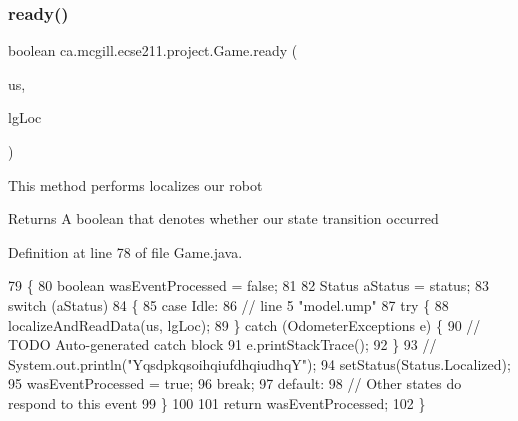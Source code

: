 \subsubsection{\texorpdfstring{ready()}{ready()}}
{\footnotesize\ttfamily boolean ca.\+mcgill.\+ecse211.\+project.\+Game.\+ready (\begin{DoxyParamCaption}\item[{\hyperlink{classca_1_1mcgill_1_1ecse211_1_1localization_1_1_ultrasonic_localizer}{Ultrasonic\+Localizer}}]{us,  }\item[{\hyperlink{classca_1_1mcgill_1_1ecse211_1_1localization_1_1_light_localizer}{Light\+Localizer}}]{lg\+Loc }\end{DoxyParamCaption})}

This method performs localizes our robot

\begin{DoxyReturn}{Returns}
A boolean that denotes whether our state transition occurred 
\end{DoxyReturn}


Definition at line 78 of file Game.\+java.


\begin{DoxyCode}
79   \{
80     \textcolor{keywordtype}{boolean} wasEventProcessed = \textcolor{keyword}{false};
81     
82     Status aStatus = status;
83     \textcolor{keywordflow}{switch} (aStatus)
84     \{
85       \textcolor{keywordflow}{case} Idle:
86         \textcolor{comment}{// line 5 "model.ump"}
87         \textcolor{keywordflow}{try} \{
88           localizeAndReadData(us, lgLoc);
89         \} \textcolor{keywordflow}{catch} (OdometerExceptions e) \{
90           \textcolor{comment}{// TODO Auto-generated catch block}
91           e.printStackTrace();
92         \}
93     \textcolor{comment}{//    System.out.println("YqsdpkqsoihqiufdhqiudhqY");}
94         setStatus(Status.Localized);
95         wasEventProcessed = \textcolor{keyword}{true};
96         \textcolor{keywordflow}{break};
97       \textcolor{keywordflow}{default}:
98         \textcolor{comment}{// Other states do respond to this event}
99     \}
100 
101     \textcolor{keywordflow}{return} wasEventProcessed;
102   \}
\end{DoxyCode}
\mbox{\label{enumca_1_1mcgill_1_1ecse211_1_1project_1_1_game_adf69abe44e952d627fb9e6a2f678cb5e}} 
